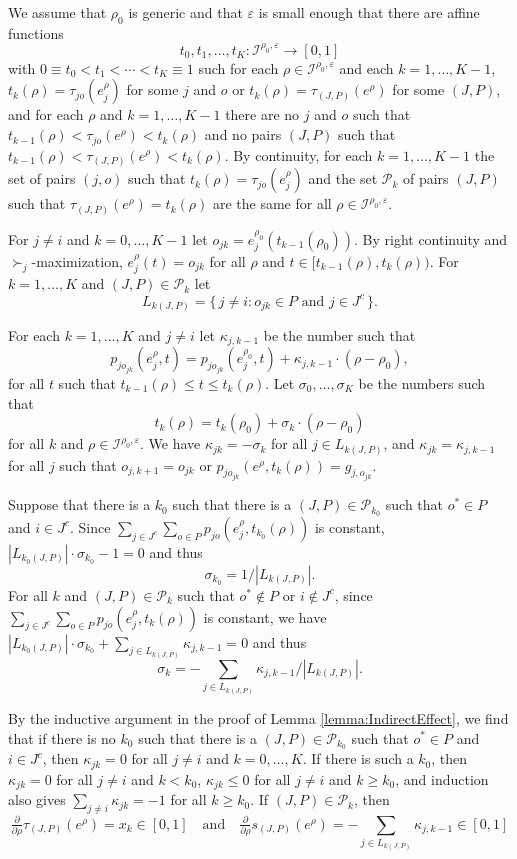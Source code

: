 \documentclass[12pt, A4paper]{article}
\theoremstyle{definition}
\newcommand{\cI}{\mathcal{I}}
\newcommand{\cP}{\mathcal{P}}
\newcommand{\varep}{\varepsilon}
\begin{document}
\begin{appendix}
We assume that $\rho_0$ is generic and that $\varep$ is small enough that there are affine functions $$t_0, t_1, \ldots, t_K \colon \cI^{\rho_0,\varep} \to [0,1]$$ with $0 \equiv t_0 < t_1 < \cdots < t_K \equiv 1$ such for each $\rho \in \cI^{\rho_0,\varep}$ and each $k = 1, \ldots, K-1$, $t_k(\rho) = \tau_{jo}(e_j^\rho)$ for some $j$ and $o$ or $t_k(\rho) = \tau_{(J,P)}(e^\rho)$ for some $(J,P)$,  and for each $\rho$ and $k = 1, \ldots, K-1$ there are no $j$ and $o$ such that $t_{k-1}(\rho) < \tau_{jo}(e^\rho) < t_k(\rho)$ and no pairs $(J,P)$ such that $t_{k-1}(\rho) < \tau_{(J,P)}(e^\rho) < t_k(\rho)$.  By continuity, for each $k = 1, \ldots, K-1$ the set of pairs $(j,o)$ such that $t_k(\rho) = \tau_{jo}(e_j^\rho)$
and the set $\cP_k$ of pairs $(J,P)$ such that $\tau_{(J,P)}(e^\rho) = t_k(\rho)$ are the same for all $\rho \in \cI^{\rho_0,\varep}$.   

For $j \ne i$ and $k = 0, \ldots, K-1$ let $o_{jk} = e^{\rho_0}_j(t_{k-1}(\rho_0))$. By right continuity and $\succ_j$-maximization, $e^{\rho}_j(t) = o_{jk}$ for all $\rho$ and $t \in [t_{k-1}(\rho),t_k(\rho))$.    For $k = 1, \ldots, K$ and $(J,P) \in \cP_k$ let $$L_{k(J,P)} = \{\, j \ne i : \text{$o_{jk} \in P$ and $j \in J^c$} \,\}.$$

For each $k = 1, \ldots, K$ and $j \ne i$ let $\kappa_{j,k-1}$ be the number such that $$p_{jo_{jk}}(e_j^\rho,t) = p_{jo_{jk}}(e_j^{\rho_0},t) +  \kappa_{j,k-1} \cdot (\rho - \rho_0),$$  for all $t$ such that
  $t_{k-1}(\rho) \le t \le t_k(\rho)$.
Let $\sigma_0, \ldots, \sigma_K$ be the numbers such that 
$$t_k(\rho) = t_k(\rho_0) + \sigma_k \cdot (\rho - \rho_0)$$ for all $k$ and $\rho \in \cI^{\rho_0,\varep}$.
We have $\kappa_{jk} = -\sigma_k$ for all $j \in L_{k(J,P)}$, and $\kappa_{jk} = \kappa_{j,k-1}$ for all $j$ such that $o_{j,k+1} = o_{jk}$ or $p_{jo_{jk}}(e^\rho,t_k(\rho)) = g_{j,o_{jk}}$.  

Suppose that there is a $k_0$ such that  there is a $(J,P) \in \cP_{k_0}$ such that $o^* \in P$ and $i \in J^c$.  Since $\sum_{j \in J^c} \sum_{o \in P} p_{jo}(e_j^\rho,t_{k_0}(\rho))$ is constant, $|L_{k_0(J,P)}| \cdot \sigma_{k_0} - 1 = 0$ and thus
$$\sigma_{k_0} = 1/|L_{k(J,P)}|.$$
For all $k$ and $(J,P) \in \cP_k$ such that $o^* \notin P$ or $i \notin J^c$, since $\sum_{j \in J^c} \sum_{o \in P} p_{jo}(e_j^\rho,t_k(\rho))$ is constant,  we have $|L_{k_0(J,P)}| \cdot \sigma_{k_0} + \sum_{j \in L_{k(J,P)}} \kappa_{j,k-1} = 0$ and thus
$$\sigma_k = - \sum_{j \in L_{k(J,P)}} \kappa_{j,k-1}/|L_{k(J,P)}|.$$  

By the inductive argument in the proof of Lemma \ref{lemma:IndirectEffect}, we find that if there is no $k_0$ such that  there is a $(J,P) \in \cP_{k_0}$ such that $o^* \in P$ and $i \in J^c$, then $\kappa_{jk} = 0$ for all $j \ne i$ and $k = 0, \ldots, K$.  If there is such a $k_0$, then $\kappa_{jk} = 0$ for all $j \ne i$ and $k < k_0$, $\kappa_{jk} \le 0$ for all $j \ne i$ and $k \ge k_0$, and induction also gives $\sum_{j \ne i} \kappa_{jk} = -1$ for all $k \ge k_0$.  If $(J,P) \in \cP_k$, then 
$$\tfrac{\partial}{\partial \rho} \tau_{(J,P)}(e^\rho) = x_k \in [0,1] \quad \text{and} \quad \tfrac{\partial}{\partial \rho} s_{(J,P)}(e^\rho) = - \sum_{j \in L_{k(J,P)}} \kappa_{j,k-1} \in [0,1]$$


\end{appendix}
\end{document}
